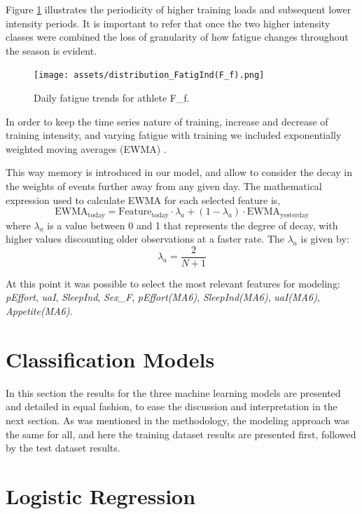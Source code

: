 \documentclass[conference]{IEEEtran}
\begin{document}
Figure \ref{fatig_Ff} illustrates the periodicity of higher training loads and subsequent lower intensity periods. It is important to refer that once the two higher intensity classes were combined the loss of granularity of how fatigue changes throughout the season is evident.  
\begin{figure}[H]
    \centering
    \texttt{[image: assets/distribution\_FatigInd(F\_f).png]}
    \caption{Daily fatigue trends for athlete F\_f.}
    \label{fatig_Ff}
\end{figure}

In order to keep the time series nature of training, increase and decrease of training intensity, and varying fatigue with training we included exponentially weighted moving averages (EWMA) \cite{Williams17}.

This way memory is introduced in our model, and allow to consider the decay in the weights of events further away from any given day. The mathematical expression used to calculate EWMA for each selected feature is,
\begin{equation*}
    \text{EWMA}_{\text{today}} = \text{Feature}_{\text{today}} \cdot \lambda_a + (1 - \lambda_a) \cdot \text{EWMA}_{\text{yesterday}}
\end{equation*}
where $\lambda_a$ is a value between 0 and 1 that represents the degree of decay, with higher values discounting older observations at a faster rate. The $\lambda_a$ is given by:
\begin{equation*}
    \lambda_a = \frac{2}{N + 1}
\end{equation*} 

At this point it was possible to select the most relevant features for modeling: \textit{pEffort}, \textit{uaI}, \textit{SleepInd}, \textit{Sex\_F}, \textit{pEffort(MA6)}, \textit{SleepInd(MA6)}, \textit{uaI(MA6)}, \textit{Appetite(MA6)}.

\section{Classification Models}

In this section the results for the three machine learning models are presented and detailed in equal fashion, to ease the discussion and interpretation in the next section. As was mentioned in the methodology, the modeling approach was the same for all, and here the training dataset results are presented first, followed by the test dataset results.

\section{Logistic Regression}
\end{document}
